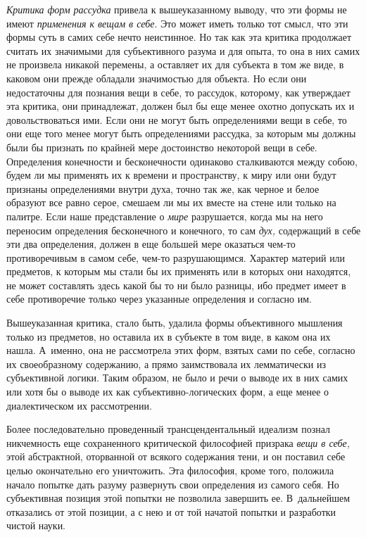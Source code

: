 {\em Критика форм рассудка} привела к вышеуказанному
выводу, что эти формы не имеют {\em применения к вещам
в себе}. Это может иметь только тот смысл, что эти формы суть в самих себе
нечто неистинное. Но так как эта критика продолжает считать их значимыми
для субъективного разума и для опыта, то она в них самих не произвела
никакой перемены, а оставляет их для субъекта в том же виде, в каковом они
прежде обладали значимостью для объекта. Но если они недостаточны для
познания вещи в себе, то рассудок, которому, как утверждает эта критика,
они принадлежат, должен был бы еще менее охотно допускать их и
довольствоваться ими. Если они не могут быть определениями вещи в себе, то
они еще того менее могут быть определениями рассудка, за которым мы должны
были бы признать по крайней мере достоинство некоторой вещи в себе.
Определения конечности и бесконечности одинаково сталкиваются между собою,
будем ли мы применять их к времени и пространству, к миру или они будут
признаны определениями внутри духа, точно так же, как черное и белое
образуют все равно серое, смешаем ли мы их вместе на стене или только на
палитре. Если наше представление о {\em мире}
разрушается, когда мы на него переносим определения бесконечного и
конечного, то сам {\em дух,} содержащий в себе эти два
определения, должен в еще большей мере оказаться чем-то противоречивым в
самом себе, чем-то разрушающимся. Характер материй или предметов, к которым
мы стали бы их применять или в которых они находятся, не может составлять
здесь какой бы то ни было разницы, ибо предмет имеет в себе противоречие
только через указанные определения и согласно им.

Вышеуказанная критика, стало быть, удалила формы объективного мышления
только из предметов, но оставила их в субъекте в том виде, в каком она их
нашла. А~именно, она не рассмотрела этих форм, взятых сами по себе,
согласно их своеобразному содержанию, а прямо заимствовала их лемматически
из субъективной логики. Таким образом, не было и речи о выводе их в них
самих или хотя бы о выводе их как субъективно-логических форм, а еще менее
о диалектическом их рассмотрении.

Более последовательно проведенный трансцендентальный идеализм познал
никчемность еще сохраненного критической философией призрака
{\em вещи в себе,} этой абстрактной, оторванной от
всякого содержания тени, и он поставил себе целью окончательно его
уничтожить.
Эта философия, кроме того, положила начало попытке дать разуму развернуть
свои определения из самого себя. Но субъективная позиция этой попытки не
позволила завершить ее. В~дальнейшем отказались от этой позиции, а с нею и
от той начатой попытки и разработки чистой науки.

